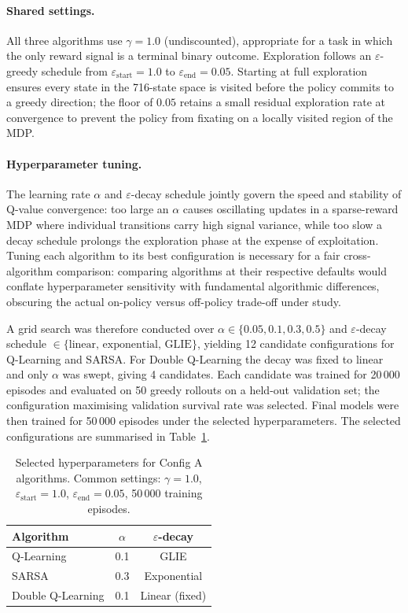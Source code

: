 \documentclass[11pt,a4paper]{article}
\begin{document}
\paragraph{Shared settings.}
All three algorithms use $\gamma = 1.0$ (undiscounted), appropriate for a
task in which the only reward signal is a terminal binary outcome.
Exploration follows an $\varepsilon$-greedy schedule from
$\varepsilon_{\text{start}} = 1.0$ to $\varepsilon_{\text{end}} = 0.05$.
Starting at full exploration ensures every state in the 716-state space is
visited before the policy commits to a greedy direction; the floor of $0.05$
retains a small residual exploration rate at convergence to prevent the policy
from fixating on a locally visited region of the MDP.

\paragraph{Hyperparameter tuning.}
The learning rate $\alpha$ and $\varepsilon$-decay schedule jointly govern the
speed and stability of Q-value convergence: too large an $\alpha$ causes
oscillating updates in a sparse-reward MDP where individual transitions carry
high signal variance, while too slow a decay schedule prolongs the exploration
phase at the expense of exploitation. Tuning each algorithm to its best
configuration is necessary for a fair cross-algorithm comparison: comparing
algorithms at their respective defaults would conflate hyperparameter
sensitivity with fundamental algorithmic differences, obscuring the actual
on-policy versus off-policy trade-off under study.

A grid search was therefore conducted over $\alpha \in \{0.05, 0.1, 0.3, 0.5\}$
and $\varepsilon$-decay schedule $\in \{\text{linear, exponential, GLIE}\}$,
yielding 12 candidate configurations for Q-Learning and SARSA. For Double
Q-Learning the decay was fixed to linear and only $\alpha$ was swept, giving
4 candidates. Each candidate was trained for 20\,000 episodes and evaluated on
50 greedy rollouts on a held-out validation set; the configuration maximising
validation survival rate was selected. Final models were then trained for
50\,000 episodes under the selected hyperparameters. The selected
configurations are summarised in Table~\ref{tab:hparam_a}.

\begin{table}[H]
\centering\small
\caption{Selected hyperparameters for Config A algorithms.
         Common settings: $\gamma=1.0$, $\varepsilon_{\text{start}}=1.0$,
         $\varepsilon_{\text{end}}=0.05$, 50\,000 training episodes.}
\label{tab:hparam_a}
\begin{tabular}{lcc}
\toprule
Algorithm & $\alpha$ & $\varepsilon$-decay \\
\midrule
Q-Learning        & 0.1 & GLIE \\
SARSA             & 0.3 & Exponential \\
Double Q-Learning & 0.1 & Linear (fixed) \\
\bottomrule
\end{tabular}
\end{table}
\end{document}
